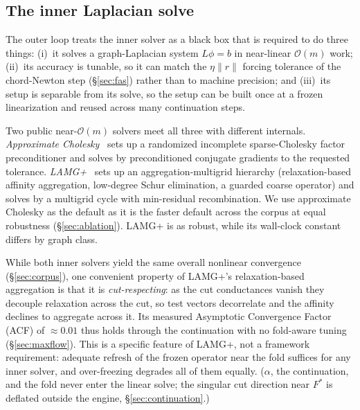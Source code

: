 \documentclass{siamart220329}
\newcommand{\Om}{\mathcal{O}(m)}
\begin{document}
\subsection{The inner Laplacian solve}\label{sec:inner}
The outer loop treats the inner solver as a black box that is required to do three things: (i)~it solves a
graph-Laplacian system $L\phi=b$ in near-linear $\Om$ work; (ii)~its accuracy is tunable, so it can match the $\eta\|r\|$ forcing tolerance  of the chord-Newton step (\S\ref{sec:fas}) rather
than to machine precision; and (iii)~its setup is separable from its solve, so the setup can be 
built once at a frozen linearization and reused across many continuation steps.

Two public near-$\Om$ solvers meet all three with different internals. \emph{Approximate
Cholesky}~\cite{approxchol} sets up a randomized incomplete sparse-Cholesky factor preconditioner and solves by preconditioned conjugate gradients to
the requested tolerance. \emph{LAMG+}~\cite{lamgplus} sets up an aggregation-multigrid
hierarchy (relaxation-based affinity aggregation, low-degree Schur elimination, a guarded coarse
operator) and solves by a multigrid cycle with min-residual recombination. We use approximate
Cholesky as the default as it is the faster default across the
corpus at equal robustness (\S\ref{sec:ablation}). LAMG+ is as robust, while its wall-clock constant
differs by graph class.

While both inner solvers yield the same overall nonlinear convergence (\S\ref{sec:corpus}), one convenient property of LAMG+'s relaxation-based aggregation is that it is \emph{cut-respecting}: as the cut conductances vanish they
decouple relaxation across the cut, so test vectors decorrelate and the affinity declines to aggregate
across it. Its measured Asymptotic Convergence Factor (ACF) of $\approx0.01$ thus holds through the continuation with
no fold-aware tuning (\S\ref{sec:maxflow}). This is a specific feature of LAMG+, not a framework requirement: adequate refresh of the frozen operator near the fold
suffices for any inner solver, and over-freezing degrades all of them equally. ($\alpha$, the
continuation, and the fold never enter the linear solve; the singular cut direction near $F^*$ is
deflated outside the engine, \S\ref{sec:continuation}.)
\end{document}
